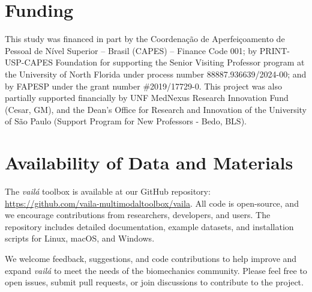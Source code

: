 \documentclass{article}
\begin{document}
\section*{Funding}

This study was financed in part by the Coordenação de Aperfeiçoamento de Pessoal de Nível Superior – Brasil (CAPES) – Finance Code 001; by PRINT-USP-CAPES Foundation for supporting the Senior Visiting Professor program at the University of North Florida under process number 88887.936639/2024-00; and by FAPESP under the grant number \#2019/17729-0. This project  was also partially supported financially by UNF MedNexus Research Innovation Fund (Cesar, GM), and the Dean’s Office for Research and Innovation of the University of São Paulo (Support Program for New Professors - Bedo, BLS).

\section*{Availability of Data and Materials}
\sloppy
The \textit{vailá} toolbox is available at our GitHub repository: \url{https://github.com/vaila-multimodaltoolbox/vaila}. All code is open-source, and we encourage contributions from researchers, developers, and users. The repository includes detailed documentation, example datasets, and installation scripts for Linux, macOS, and Windows.

We welcome feedback, suggestions, and code contributions to help improve and expand \textit{vailá} to meet the needs of the biomechanics community. Please feel free to open issues, submit pull requests, or join discussions to contribute to the project.



\par
\end{document}
